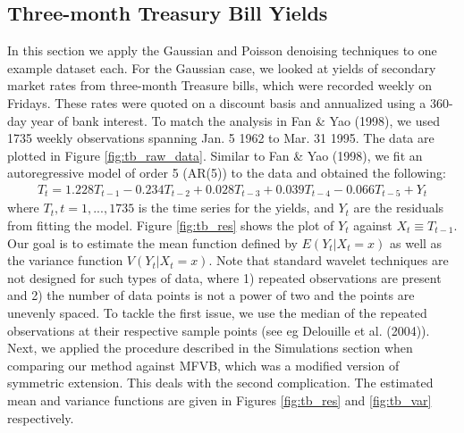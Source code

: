 \documentclass[12pt]{article}
\begin{document}
\subsection{Three-month Treasury Bill Yields}
In this section we apply the Gaussian and Poisson denoising techniques to one example dataset each. For the Gaussian case, we looked at yields of secondary market rates from three-month Treasure bills, which were recorded weekly on Fridays. These rates were quoted on a discount basis and annualized using a 360-day year of bank interest. To match the analysis in Fan \& Yao (1998), we used 1735 weekly observations spanning Jan. 5 1962 to Mar. 31 1995. The data are plotted in Figure \ref{fig:tb_raw_data}. Similar to Fan \& Yao (1998), we fit an autoregressive model of order 5 (AR(5)) to the data and obtained the following:
\begin{eqnarray}
T_t=1.228T_{t-1}-0.234T_{t-2}+0.028T_{t-3}+0.039T_{t-4}-0.066T_{t-5}+Y_t
\end{eqnarray}
where $T_t, t=1,...,1735$ is the time series for the yields, and $Y_t$ are the residuals from fitting the model. Figure \ref{fig:tb_res} shows the plot of $Y_t$ against $X_t\equiv T_{t-1}$. Our goal is to estimate the mean function defined by $E(Y_t|X_t=x)$ as well as the variance function $V(Y_t|X_t=x)$. Note that standard wavelet techniques are not designed for such types of data, where 1) repeated observations are present and 2) the number of data points is not a power of two and the points are unevenly spaced. To tackle the first issue, we use the median of the repeated observations at their respective sample points (see eg Delouille et al. (2004)). Next, we applied the procedure described in the Simulations section when comparing our method against MFVB, which was a modified version of symmetric extension. This deals with the second complication. The estimated mean and variance functions are given in Figures \ref{fig:tb_res} and \ref{fig:tb_var} respectively.\bigskip\\
\end{document}
